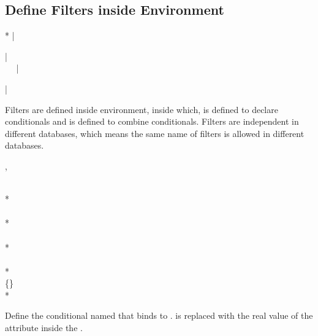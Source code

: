 \documentclass[full]{l3doc}
\begin{document}
\begin{documentation}
\subsection{Define Filters inside  Environment}

\noindent{}
\begin{Syntax}*
  |\begin{dbFilters}| \\
  ~~
  |\end{dbFilters}| \\
\end{Syntax}

Filters are defined inside  environment, inside which,
 is defined to declare conditionals and
 is defined to combine conditionals. Filters are
independent in different databases, which means the same name of filters is
allowed in different databases.

\begin{function}{\dbNewConditional, \dbNewConditional*}
  \begin{syntax}
                \\
    *           \\[2pt]
         \\
    *    \\
         \\
    *    \\
          \\
    *     \\
          \{\textbar{}\} \\
    *     
  \end{syntax}

  Define the conditional named  that binds to . 
  is replaced with the real value of the attribute inside the .
\end{function}


\end{documentation}
\end{document}

